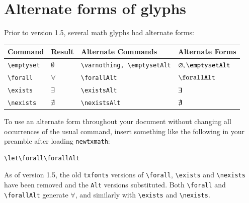 \documentclass[\fsc]{article}
\theoremstyle{oldplain}
\theoremstyle{plain}
\begin{document}
%


\section{Alternate forms of glyphs}
Prior to version 1.5, several math glyphs had alternate forms:
\begin{center}
  \begin{tabular}{@{} llll @{}}
    \hline
    Command & Result &  Alternate Commands & Alternate Forms\\ 
    \hline
    \verb|\emptyset| & $\emptyset$ & \verb|\varnothing, \emptysetAlt|& $\varnothing, \emptysetAlt$ \\ 
    \verb|\forall| & $\forall$ & \verb|\forallAlt| & $\forallAlt$ \\ 
    \verb|\exists| & $\exists$ & \verb|\existsAlt| & $\exists$ \\ 
    \verb|\nexists| & $\nexists$ & \verb|\nexistsAlt| & $\nexists$ \\ 
    \hline
  \end{tabular}
\end{center}

To use an alternate form throughout your document without changing all occurrences of the usual command, insert something like the following in your preamble after loading \texttt{newtxmath}:
\begin{verbatim}
\let\forall\forallAlt
\end{verbatim}
As of version 1.5, the old {\tt txfonts} versions of \verb|\forall|, \verb|\exists| and \verb|\nexists| have been removed and the {\tt Alt} versions substituted. Both \verb|\forall| and \verb|\forallAlt| generate $\forall$, and similarly with \verb|\exists| and \verb|\nexists|.
\end{document}

